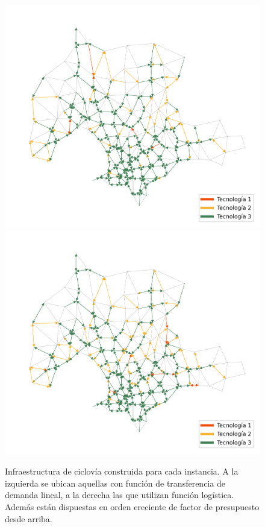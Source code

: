 \begin{figure}[h!]
  \includegraphics[width=.49\linewidth]{../resources/montevideo_d3000.0_linear_1.6_budget_factor.png}
  \includegraphics[width=.49\linewidth]{../resources/montevideo_d3000.0_inv_logit_1.6_budget_factor.png}
  \caption{Infraestructura de ciclovía construida para cada instancia. A la izquierda se ubican aquellas con función de transferencia de demanda lineal, a la derecha las que utilizan función logística. Además están dispuestas en orden creciente de factor de presupuesto desde arriba.}
  \label{fig:montevideo_instances_infras}
\end{figure}

